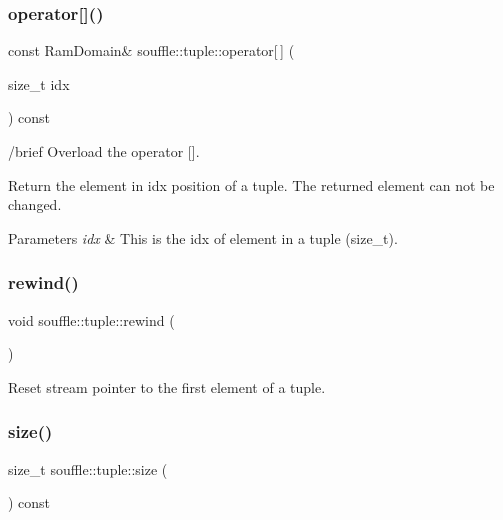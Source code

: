 \subsubsection{\texorpdfstring{operator[]()}{operator[]()}\hspace{0.1cm}{\footnotesize\ttfamily [2/2]}}
{\footnotesize\ttfamily const Ram\+Domain\& souffle\+::tuple\+::operator\mbox{[}$\,$\mbox{]} (\begin{DoxyParamCaption}\item[{size\+\_\+t}]{idx }\end{DoxyParamCaption}) const\hspace{0.3cm}{\ttfamily [inline]}}

/brief Overload the operator \mbox{[}\mbox{]}.

Return the element in idx position of a tuple. The returned element can not be changed. 
\begin{DoxyParams}{Parameters}
{\em idx} & This is the idx of element in a tuple (size\+\_\+t). \\
\hline
\end{DoxyParams}
\mbox{\label{classsouffle_1_1tuple_a178e16d502713964b96c2346592255a1}} 
\subsubsection{\texorpdfstring{rewind()}{rewind()}}
{\footnotesize\ttfamily void souffle\+::tuple\+::rewind (\begin{DoxyParamCaption}{ }\end{DoxyParamCaption})\hspace{0.3cm}{\ttfamily [inline]}}

Reset stream pointer to the first element of a tuple. \mbox{\label{classsouffle_1_1tuple_ac1e884fd470e139ca8223af684f379bc}} 
\subsubsection{\texorpdfstring{size()}{size()}}
{\footnotesize\ttfamily size\+\_\+t souffle\+::tuple\+::size (\begin{DoxyParamCaption}{ }\end{DoxyParamCaption}) const\hspace{0.3cm}{\ttfamily [inline]}}

